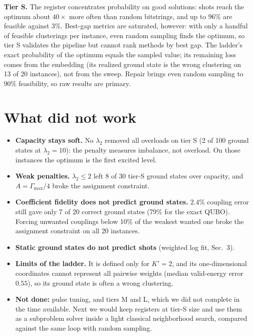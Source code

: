 \documentclass[10pt]{article}
\begin{document}
\noindent\textbf{Tier S.} The register concentrates probability on good solutions: shots reach the optimum about
$40\times$ more often than random bitstrings, and up to 96\% are feasible against 3\%. Best-gap metrics are saturated,
however: with only a handful of feasible clusterings per instance, even random sampling finds the optimum, so tier S
validates the pipeline but cannot rank methods by best gap. The ladder's exact probability of the optimum equals the
sampled value; its remaining loss comes from the embedding (its realized ground state is the wrong clustering on 13 of
20 instances), not from the sweep. Repair brings even random sampling to 90\% feasibility, so raw results are primary.


\section{What did not work}
\begin{itemize}\setlength\itemsep{1pt}
\item \textbf{Capacity stays soft.} No $\lambda_2$ removed all overloads on tier S (2 of 100 ground states at
$\lambda_2=10$): the penalty measures imbalance, not overload. On those instances the optimum is the first excited level.
\item \textbf{Weak penalties.} $\lambda_2\le2$ left 8 of 30 tier-S ground states over capacity, and
$A=\Gamma_{\max}/4$ broke the assignment constraint.
\item \textbf{Coefficient fidelity does not predict ground states.} $2.4\%$ coupling error still gave only 7 of 20
correct ground states (79\% for the exact QUBO). Forcing unwanted couplings below 10\% of the weakest wanted one broke
the assignment constraint on all 20 instances.
\item \textbf{Static ground states do not predict shots} (weighted log fit, Sec.~3).
\item \textbf{Limits of the ladder.} It is defined only for $K'=2$, and its one-dimensional coordinates cannot
represent all pairwise weights (median valid-energy error $0.55$), so its ground state is often a wrong clustering.
\item \textbf{Not done:} pulse tuning, and tiers M and L, which we did not complete in the time available. Next we would keep
registers at tier-S size and use them as a subproblem solver inside a light classical neighborhood search, compared
against the same loop with random sampling.
\end{itemize}
\end{document}
